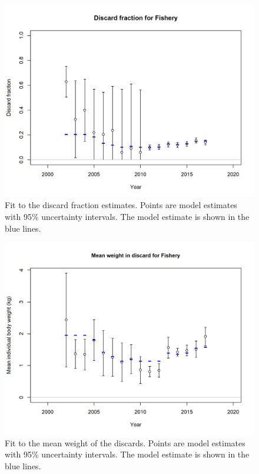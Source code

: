 \documentclass[12pt,]{article}
\begin{document}
\begin{figure}
\centering
\includegraphics{r4ss/plots_mod1/discard_fitFishery.png}
\caption{Fit to the discard fraction estimates. Points are model
estimates with 95\% uncertainty intervals. The model estimate is shown
in the blue lines.\label{fig:discard_fitFishery}}
\end{figure}

\begin{figure}
\centering
\includegraphics{r4ss/plots_mod1/bodywt_fit_fltFishery.png}
\caption{Fit to the mean weight of the discards. Points are model
estimates with 95\% uncertainty intervals. The model estimate is shown
in the blue lines.\label{fig:bodywt_fit_fltFishery}}
\end{figure}
\end{document}
